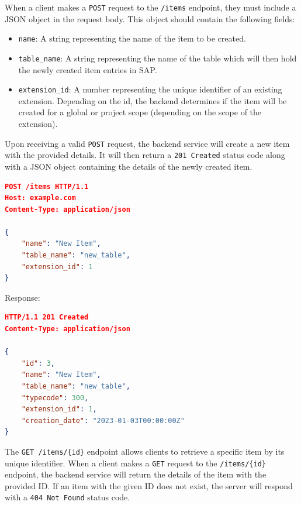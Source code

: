 When a client makes a \texttt{POST} request to the \texttt{/items} endpoint, they must include a JSON object in the request body.
This object should contain the following fields:

\begin{itemize}
    \item \texttt{name}: A string representing the name of the item to be created.
    \item \texttt{table\_name}: A string representing the name of the table which will then hold the newly created item entries in SAP.
    \item \texttt{extension\_id}: A number representing the unique identifier of an existing extension.
    Depending on the id, the backend determines if the item will be created for a global or project scope (depending on the scope of the extension).
\end{itemize}

Upon receiving a valid \texttt{POST} request, the backend service will create a new item with the provided details.
It will then return a \texttt{201 Created} status code along with a JSON object containing the details of the newly created item.

\begin{lstlisting}[language=json,label={lst:lstlisting7}]
POST /items HTTP/1.1
Host: example.com
Content-Type: application/json

{
    "name": "New Item",
    "table_name": "new_table",
    "extension_id": 1
}
\end{lstlisting}

Response:

\begin{lstlisting}[language=json,label={lst:lstlisting8}]
HTTP/1.1 201 Created
Content-Type: application/json

{
    "id": 3,
    "name": "New Item",
    "table_name": "new_table",
    "typecode": 300,
    "extension_id": 1,
    "creation_date": "2023-01-03T00:00:00Z"
}
\end{lstlisting}


The \texttt{GET /items/\{id\}} endpoint allows clients to retrieve a specific item by its unique identifier.
When a client makes a \texttt{GET} request to the \texttt{/items/\{id\}} endpoint, the backend service will return the details of the item with the provided ID. If an item with the given ID does not exist, the server will respond with a \texttt{404 Not Found} status code.

